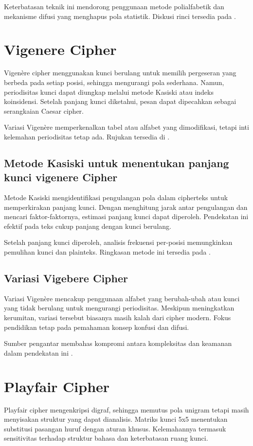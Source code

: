 \documentclass[../main.tex]{subfiles}
\begin{document}
Keterbatasan teknik ini mendorong penggunaan metode polialfabetik dan mekanisme difusi yang menghapus pola statistik. Diskusi rinci tersedia pada \textcite{menezes1996handbook}.

\section{Vigenere Cipher}
Vigenère cipher menggunakan kunci berulang untuk memilih pergeseran yang berbeda pada setiap posisi, sehingga mengurangi pola sederhana. Namun, periodisitas kunci dapat diungkap melalui metode Kasiski atau indeks koinsidensi. Setelah panjang kunci diketahui, pesan dapat dipecahkan sebagai serangkaian Caesar cipher.

Variasi Vigenère memperkenalkan tabel atau alfabet yang dimodifikasi, tetapi inti kelemahan periodisitas tetap ada. Rujukan tersedia di \textcite{menezes1996handbook}.

\subsection{Metode Kasiski untuk menentukan panjang kunci vigenere Cipher}
Metode Kasiski mengidentifikasi pengulangan pola dalam cipherteks untuk memperkirakan panjang kunci. Dengan menghitung jarak antar pengulangan dan mencari faktor-faktornya, estimasi panjang kunci dapat diperoleh. Pendekatan ini efektif pada teks cukup panjang dengan kunci berulang.

Setelah panjang kunci diperoleh, analisis frekuensi per-posisi memungkinkan pemulihan kunci dan plainteks. Ringkasan metode ini tersedia pada \textcite{menezes1996handbook}.

\subsection{Variasi Vigebere Cipher}
Variasi Vigenère mencakup penggunaan alfabet yang berubah-ubah atau kunci yang tidak berulang untuk mengurangi periodisitas. Meskipun meningkatkan kerumitan, variasi tersebut biasanya masih kalah dari cipher modern. Fokus pendidikan tetap pada pemahaman konsep konfusi dan difusi.

Sumber pengantar membahas kompromi antara kompleksitas dan keamanan dalam pendekatan ini \parencite{menezes1996handbook}.

\section{Playfair Cipher}
Playfair cipher mengenkripsi digraf, sehingga memutus pola unigram tetapi masih menyisakan struktur yang dapat dianalisis. Matriks kunci 5x5 menentukan substitusi pasangan huruf dengan aturan khusus. Kelemahannya termasuk sensitivitas terhadap struktur bahasa dan keterbatasan ruang kunci.
\end{document}
